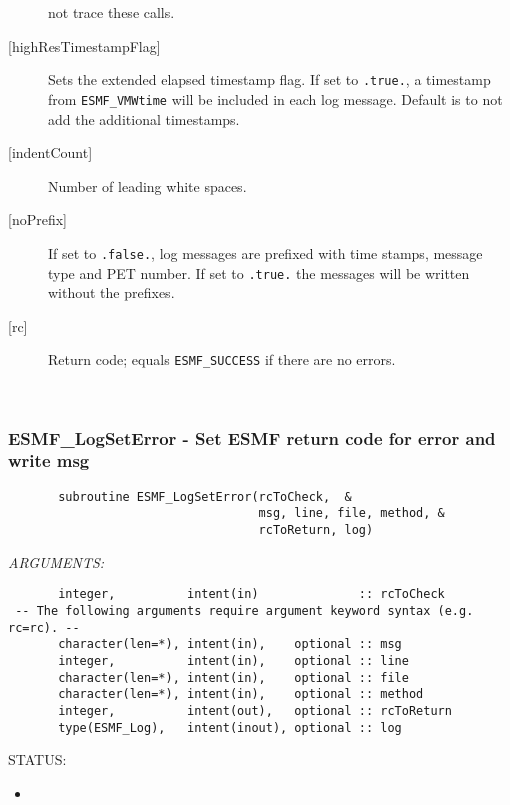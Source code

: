 \begin{description}
\begin{sloppypar}
              not trace these calls.
             \end{sloppypar}
        \item [{[highResTimestampFlag]}]
              Sets the extended elapsed timestamp flag.  If set to {\tt .true.}, a timestamp
              from {\tt ESMF\_VMWtime} will be included in each log message.  Default is
              to not add the additional timestamps.
        \item [{[indentCount]}]
              Number of leading white spaces.
        \item [{[noPrefix]}]
              If set to {\tt .false.}, log messages are prefixed with time stamps,
              message type and PET number.  If set to {\tt .true.} the messages will be
              written without the prefixes.
        \item [{[rc]}]
              Return code; equals {\tt ESMF\_SUCCESS} if there are no errors.
        \end{description}
   
 
\mbox{}\hrulefill\ 
 
\subsubsection [ESMF\_LogSetError] {ESMF\_LogSetError - Set ESMF return code for error and write msg}


 
\begin{verbatim}       subroutine ESMF_LogSetError(rcToCheck,  &
                                   msg, line, file, method, &
                                   rcToReturn, log)
 \end{verbatim}{\em ARGUMENTS:}
\begin{verbatim}       integer,          intent(in)              :: rcToCheck
 -- The following arguments require argument keyword syntax (e.g. rc=rc). --
       character(len=*), intent(in),    optional :: msg
       integer,          intent(in),    optional :: line
       character(len=*), intent(in),    optional :: file
       character(len=*), intent(in),    optional :: method
       integer,          intent(out),   optional :: rcToReturn
       type(ESMF_Log),   intent(inout), optional :: log
 \end{verbatim}
{\sf STATUS:}
   \begin{itemize}
   \item{}
   \end{itemize}
  
